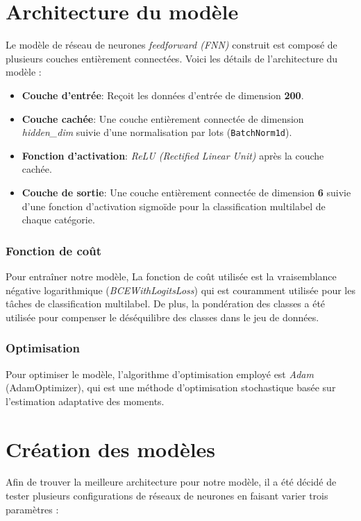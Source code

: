 \section{Architecture du modèle}

Le modèle de réseau de neurones \textit{feedforward (FNN)} construit est composé de plusieurs couches entièrement connectées. Voici les détails de l'architecture du modèle :
\begin{itemize}
    \item \textbf{Couche d'entrée}: Reçoit les données d'entrée de dimension \textbf{200}.
    \item \textbf{Couche cachée}: Une couche entièrement connectée de dimension \textit{hidden\_dim} suivie d'une normalisation par lots (\texttt{BatchNorm1d}).
    \item \textbf{Fonction d'activation}: \textit{ReLU (Rectified Linear Unit)} après la couche cachée.
    \item \textbf{Couche de sortie}: Une couche entièrement connectée de dimension \textbf{6} suivie d'une fonction d'activation sigmoïde pour la classification multilabel de chaque catégorie.
\end{itemize}

\subsubsection{Fonction de coût}

Pour entraîner notre modèle, La fonction de coût utilisée est la vraisemblance négative logarithmique (\textit{BCEWithLogitsLoss}) qui est couramment utilisée pour les tâches de classification multilabel.
De plus, la pondération des classes a été utilisée pour compenser le déséquilibre des classes dans le jeu de données.
\subsubsection{Optimisation}

Pour optimiser le modèle, l'algorithme d'optimisation employé est \textit{Adam} (AdamOptimizer), qui est une méthode d'optimisation stochastique basée sur l'estimation adaptative des moments.

\section{Création des modèles}

Afin de trouver la meilleure architecture pour notre modèle, il a été décidé de tester plusieurs configurations de réseaux de neurones en faisant varier trois paramètres :

